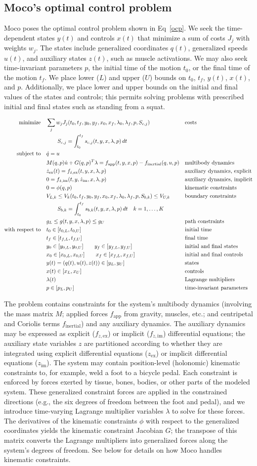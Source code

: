 \documentclass[10pt,letterpaper]{article}
\newcommand{\ocp}{
\begin{adjustwidth}{-1.125in}{-1.125in} %
\begin{align}
    \begin{aligned}
        \mbox{minimize}
         \quad & \sum_j w_{j} J_{j}(t_0, t_f, y_0, y_f, x_{0}, \mathrlap{x_{f}, \lambda_0, \lambda_f, p, S_{c,j})} && \textrm{costs} \\
        & \quad\quad S_{c,j} = \int_{t_0}^{t_f} s_{c,j}(t, y, x, \lambda, p)\,dt  \\
        \mbox{subject to}
         \quad & \dot{q} = u \\
         & M(q, p)\dot{u} + G(q, p)^T \lambda = f_{\mathrm{app}}(t, y, x, p) - f_{\mathrm{inertial}}(q, u, p)  && \textrm{multibody dynamics} \\
         & \dot{z}_\textrm{ex}(t) = f_{\dot{z},\textrm{ex}}(t, y, x, \lambda, p) && \textrm{auxiliary dynamics, explicit} \\
         & 0 = f_{\dot{z},\textrm{im}}(t, y, \dot{z}_{\textrm{im}}, x, \lambda, p) &&  \textrm{auxiliary dynamics, implicit}\\
         & 0 = \phi(q, p) && \textrm{kinematic constraints} \\
         & V_{L,k} \leq V_k(t_0, t_f, y_0, y_f, x_{0}, x_{f}, \lambda_0, \lambda_f, p, S_{b,k}) \leq V_{U,k} && \textrm{boundary constraints} \\
         & \quad\quad S_{b,k} = \int_{t_0}^{t_f} s_{b,k}(t, y, x, \lambda, p)\,dt \quad k = 1, \ldots, K\\
         & g_{L} \leq g(t, y, x, \lambda, p) \leq g_{U} && \textrm{path constraints} \\
         \mbox{with respect to} \quad
         & t_0 \in [t_{0,L}, t_{0,U}] && \textrm{initial time} \\
         & t_f \in [t_{f,L}, t_{f,U}] && \textrm{final time} \\
         & y_0 \in [y_{0,L}, y_{0,U}] \quad\quad y_f \in [y_{f,L}, y_{f,U}] && \textrm{initial and final states} \\
         & x_0 \in [x_{0,L}, x_{0,U}] \quad\quad x_f \in [x_{f,L}, x_{f,U}] && \textrm{initial and final controls} \\  
         & y(t) = (q(t), u(t), z(t)) \in [y_{L}, y_{U}] && \textrm{states} \\
         & x(t) \in [x_{L}, x_{U}] && \textrm{controls} \\
         & \lambda(t) && \textrm{Lagrange multipliers} \\
         & p \in [p_{L}, p_{U}] && \textrm{time-invariant parameters}
    \end{aligned}
    \label{ocp}
\end{align}
\end{adjustwidth}
}
\begin{document}
\linenumbers


\subsection*{Moco's optimal control problem}

Moco poses the optimal control problem shown in Eq~\ref{ocp}. We seek the time-dependent states $y(t)$ and controls $x(t)$ that minimize a sum of costs $J_j$ with weights $w_j$. The states include generalized coordinates $q(t)$, generalized speeds $u(t)$, and auxiliary states $z(t)$, such as muscle activations. We may also seek time-invariant parameters $p$, the initial time of the motion $t_0$, or the final time of the motion $t_f$. We place lower ($L$) and upper ($U$) bounds on $t_0$, $t_f$, $y(t)$, $x(t)$, and $p$. Additionally, we place lower and upper bounds on the initial and final values of the states and controls; this permits solving problems with prescribed initial and final states such as standing from a squat.

\ocp

The problem contains constraints for the system's multibody dynamics (involving the mass matrix $M$; applied forces $f_\mathrm{app}$ from gravity, muscles, etc.; and centripetal and Coriolis terms $f_\mathrm{inertial}$) and any auxiliary dynamics. The auxiliary dynamics may be expressed as explicit ($f_{\dot{z},\mathrm{ex}}$) or implicit ($f_{\dot{z},\mathrm{im}}$) differential equations; the auxiliary state variables $z$ are partitioned according to whether they are integrated using explicit differential equations ($z_{\mathrm{ex}}$) or implicit differential equations ($z_{\mathrm{im}}$). The system may contain position-level (holonomic) kinematic constraints to, for example, weld a foot to a bicycle pedal. Each constraint is enforced by forces exerted by tissue, bones, bodies, or other parts of the modeled system. These generalized constraint forces are applied in the constrained directions (e.g., the six degrees of freedom between the foot and pedal), and we introduce time-varying Lagrange multiplier variables $\lambda$ to solve for these forces. The derivatives of the kinematic constraints $\phi$ with respect to the generalized coordinates yields the kinematic constraint Jacobian $G$; the transpose of this matrix converts the Lagrange multipliers into generalized forces along the system's degrees of freedom. See below for details on how Moco handles kinematic constraints.
\end{document}
